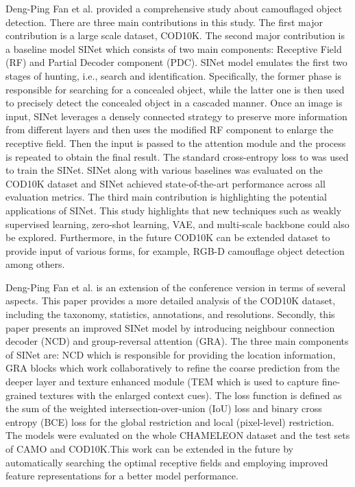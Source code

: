 \documentclass[conference]{IEEEtran}
\begin{document}
Deng-Ping Fan et al. \cite{9156837} provided a comprehensive study about camouflaged object detection. There are three main contributions in this study. The first major contribution is a large scale dataset, COD10K. The second major contribution is a baseline model SINet which consists of two main components: Receptive Field (RF) and Partial Decoder component (PDC). SINet model emulates the first two stages of hunting, i.e., search and identification. Specifically, the former phase is responsible for searching for a concealed object, while the latter one is then used to precisely detect the concealed object in a cascaded manner.  Once an image is input, SINet leverages a densely connected strategy to preserve more information from different layers and then uses the modified RF component to enlarge the receptive field. Then the input is passed to the attention module and the process is repeated to obtain the final result. The standard cross-entropy loss to was used to train the SINet. SINet along with various baselines was evaluated on the COD10K dataset and SINet achieved state-of-the-art performance across all evaluation metrics. The third main contribution is highlighting the potential applications of SINet. This study highlights that new techniques such as weakly supervised learning, zero-shot learning, VAE, and multi-scale backbone could also be explored. Furthermore, in the future COD10K can be extended dataset to provide input of various forms, for example, RGB-D camouflage object detection among others.

Deng-Ping Fan et al. \cite{ConcealedFan} is an extension of the conference version \cite{9156837} in terms of several aspects. This paper provides a more detailed analysis of the COD10K dataset, including the taxonomy, statistics, annotations, and resolutions. Secondly, this paper presents an improved SINet model by introducing neighbour connection decoder (NCD) and group-reversal attention (GRA). The three main components of SINet are: NCD which is responsible for providing the location information, GRA blocks which work collaboratively to refine the coarse prediction from the deeper layer  and texture enhanced module (TEM which is used to capture fine-grained textures with the enlarged context cues). The loss function is defined as the sum of the weighted intersection-over-union (IoU) loss and binary cross entropy (BCE) loss for the global restriction and local (pixel-level) restriction. The models were evaluated on the whole CHAMELEON dataset and the test sets of CAMO and COD10K.This work can be extended in the future by automatically searching the optimal receptive fields and employing improved feature representations for a better model performance.
\end{document}
